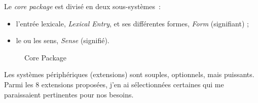 \documentclass[a4paper,12pt]{article}
\begin{document}
\pagebreak %
Le \textit{core package} est divis\'e en deux sous-syst\`emes~:
\begin{itemize}
\item l'entr\'ee lexicale, \textit{Lexical Entry}, et ses diff\'erentes formes, \textit{Form} (signifiant) ;
\item le ou les sens, \textit{Sense} (signifi\'e).
\end{itemize}

\begin{figure}[h]
\centerline{}
\caption{Core Package}
\end{figure}

\pagebreak %

Les syst\`emes p\'eriph\'eriques (extensions) sont souples, optionnels, mais puissants. Parmi les 8 extensions propos\'ees, j'en ai s\'electionn\'ees certaines qui me paraissaient pertinentes pour nos besoins.
\end{document}

